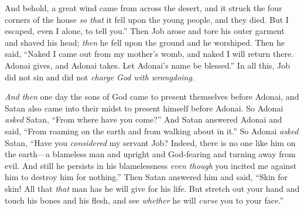 \begin{biblechapter}
\verse And behold, a great wind came from across the desert, and it struck the four corners of the house \textit{so that} it fell upon the young people, and they died. But I escaped, even I alone, to tell you.”
\verse Then Job arose and tore his outer garment and shaved his head; \textit{then} he fell upon the ground and he worshiped.
\verse Then he said, “Naked I came out from my mother’s womb, and naked I will return there. Adonai gives, and Adonai takes. Let Adonai’s name be blessed.”
\verse In all this, Job did not sin and did not \textit{charge God with wrongdoing}.
\end{biblechapter}

\begin{biblechapter} %
 \textit{And then} one day the sons of God came to present themselves before Adonai, and Satan also came into their midst to present himself before Adonai.
\verse So Adonai \textit{asked} Satan, “From where have you come?” And Satan answered Adonai and said, “From roaming on the earth and from walking about in it.”
\verse So Adonai \textit{asked} Satan, “Have you \textit{considered} my servant Job? Indeed, there is no one like him on the earth—a blameless man and upright and God-fearing and turning away from evil. And still he persists in his blamelessness \textit{even though} you incited me against him to destroy him for nothing.”
\verse Then Satan answered him and said, “Skin for skin! All that \textit{that} man has he will give for his life.
\verse But stretch out your hand and touch his bones and his flesh, and see \textit{whether} he will \textit{curse} you to your face.”

\end{biblechapter}
